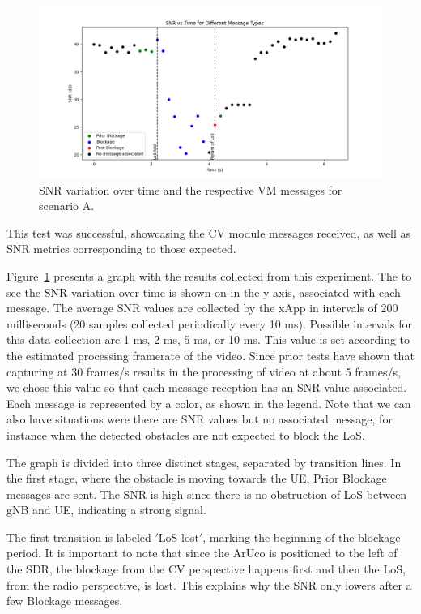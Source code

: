 \begin{figure}[H]
    \centering
    \includegraphics[width=\linewidth]{figures/results_0}
    \caption{SNR variation over time and the respective VM messages for scenario A.}
    \label{fig:results_0}
\end{figure}


This test was successful, showcasing the CV module messages received, as well as SNR metrics corresponding to those expected.

Figure~\ref{fig:results_0} presents a graph with the results collected from this experiment.
The to see the SNR variation over time is shown on in the y-axis, associated with each message.
The average SNR values are collected by the xApp in intervals of 200 milliseconds (20 samples collected periodically every 10 ms).
Possible intervals for this data collection are 1 ms, 2 ms, 5 ms, or 10 ms.
This value is set according to the estimated processing framerate of the video.
Since prior tests have shown that capturing at 30 frames/s results in the processing of video at about 5 frames/s, we chose this value so that each message reception has an SNR value associated.
Each message is represented by a color, as shown in the legend.
Note that we can also have situations were there are SNR values but no associated message, for instance when the detected obstacles are not expected to block the LoS\@.

The graph is divided into three distinct stages, separated by transition lines.
In the first stage, where the obstacle is moving towards the UE, Prior Blockage messages are sent.
The SNR is high  since there is no obstruction of LoS between gNB and UE, indicating a strong signal.

The first transition is labeled \('\)LoS lost\('\), marking the beginning of the blockage period.
It is important to note that since the ArUco is positioned to the left of the SDR, the blockage from the CV perspective happens first and then the LoS, from the radio perspective, is lost.
This explains why the SNR only lowers after a few Blockage messages.

